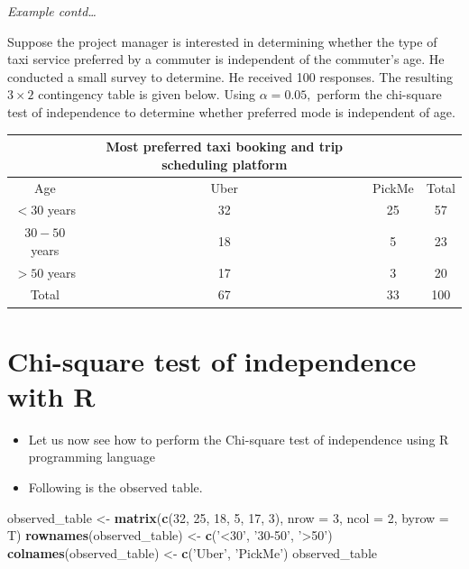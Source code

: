 \documentclass[]{book}
\newenvironment{Shaded}{\begin{snugshade}}{\end{snugshade}}
\newcommand{\DataTypeTok}[1]{\textcolor[rgb]{0.13,0.29,0.53}{#1}}
\newcommand{\DecValTok}[1]{\textcolor[rgb]{0.00,0.00,0.81}{#1}}
\newcommand{\KeywordTok}[1]{\textcolor[rgb]{0.13,0.29,0.53}{\textbf{#1}}}
\newcommand{\NormalTok}[1]{#1}
\newcommand{\StringTok}[1]{\textcolor[rgb]{0.31,0.60,0.02}{#1}}
\providecommand{\tightlist}{%
  \setlength{\itemsep}{0pt}\setlength{\parskip}{0pt}}
\begin{document}
\emph{Example contd\ldots{}}

Suppose the project manager is interested in determining whether the type of taxi service preferred by a commuter is independent of the commuter's age. He conducted a small survey to determine. He received 100 responses. The resulting \(3\times2\) contingency table is
given below. Using \(\alpha =0.05,\) perform the chi-square test of independence to determine whether preferred mode is independent of age.

\begin{longtable}[]{@{}cccc@{}}
\toprule
& Most preferred taxi booking and trip scheduling platform & &\tabularnewline
\midrule
\endhead
Age & Uber & PickMe & Total\tabularnewline
\(< 30\) years & 32 & 25 & 57\tabularnewline
\(30-50\) years & 18 & 5 & 23\tabularnewline
\(> 50\) years & 17 & 3 & 20\tabularnewline
Total & 67 & 33 & 100\tabularnewline
\bottomrule
\end{longtable}

\hypertarget{chi-square-test-of-independence-with-r}{%
\section{Chi-square test of independence with R}\label{chi-square-test-of-independence-with-r}}

\begin{itemize}
\tightlist
\item
  Let us now see how to perform the Chi-square test of independence using R programming language
\end{itemize}

\begin{itemize}
\tightlist
\item
  Following is the observed table.
\end{itemize}

\begin{Shaded}
\begin{Highlighting}[]
\NormalTok{observed_table <-}\StringTok{ }\KeywordTok{matrix}\NormalTok{(}\KeywordTok{c}\NormalTok{(}\DecValTok{32}\NormalTok{, }\DecValTok{25}\NormalTok{, }\DecValTok{18}\NormalTok{, }\DecValTok{5}\NormalTok{, }\DecValTok{17}\NormalTok{, }\DecValTok{3}\NormalTok{), }\DataTypeTok{nrow =} \DecValTok{3}\NormalTok{, }\DataTypeTok{ncol =} \DecValTok{2}\NormalTok{, }\DataTypeTok{byrow =}\NormalTok{ T)}
\KeywordTok{rownames}\NormalTok{(observed_table) <-}\StringTok{ }\KeywordTok{c}\NormalTok{(}\StringTok{'<30'}\NormalTok{, }\StringTok{'30-50'}\NormalTok{, }\StringTok{'>50'}\NormalTok{)}
\KeywordTok{colnames}\NormalTok{(observed_table) <-}\StringTok{ }\KeywordTok{c}\NormalTok{(}\StringTok{'Uber'}\NormalTok{, }\StringTok{'PickMe'}\NormalTok{)}
\NormalTok{observed_table}
\end{Highlighting}
\end{Shaded}
\end{document}
